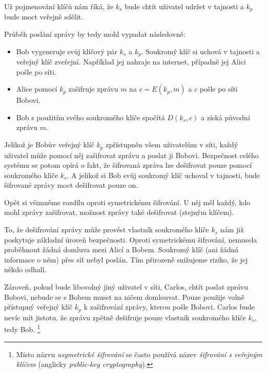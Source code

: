 \documentclass[
  program=infoi,
  biblatex,
  figures=false,
  glossaries,
  index
]{kidiplom}
\begin{document}
    Už pojmenování klíčů nám říká, že $k_s$ bude chtít uživatel udržet v tajnosti a $k_p$ bude moct veřejně sdělit.

    \medskip

    Průběh poslání zprávy by tedy mohl vypadat následovně:

    \begin{itemize}
        \item
            Bob vygeneruje svůj klíčový pár $k_s$ a $k_p$.
            Soukromý klíč si uchová v tajnosti a veřejný klíč zveřejní. Například jej nahraje na internet, případně jej Alici pošle po síti.
        \item
            Alice pomocí $k_p$ zašifruje zprávu $m$ na $c=E(k_p, m)$ a $c$ pošle po síti Bobovi.
        \item 
            Bob s použitím svého soukromého klíče spočítá $D(k_s, c)$ a získá původní zprávu $m$.
    \end{itemize}

    Jelikož je Bobův veřejný klíč $k_p$ zpřístupněn všem uživatelům v síti, každý uživatel může pomocí něj zašifrovat zprávu a poslat ji Bobovi.
    Bezpečnost celého systému se potom opírá o fakt, že šifrovaná zpráva lze dešifrovat pouze pomocí soukromého klíče $k_s$.
    A jelikož si Bob svůj soukromý klíč uchoval v tajnosti, bude šifrované zprávy moct dešifrovat pouze on.

    \begin{remark}
        Opět si všimněme rozdílu oproti symetrickému šifrování.
        U něj měl každý, kdo mohl zprávy zašifrovat, možnost zprávy také dešifrovat (stejným klíčem).
    \end{remark}

    To, že dešifrování zprávy může provést vlastník soukromého klíče $k_s$ nám již poskytuje základní úroveň bezpečnosti.
    Oproti symetrickému šifrování, nemusela proběhnout žádná domluva mezi Alicí a Bobem.
    Soukromý klíč (ani žádná informace o něm) přes síť nebyl poslán. Tím přirozeně snižujeme riziko, že jej někdo odhalí.

    Zároveň, pokud bude libovolný jiný uživatel v síti, Carlos, chtít poslat zprávu Bobovi, nebude se s Bobem muset na ničem domlouvat.
    Pouze použije volně přístupný veřejný klíč $k_p$ k zašifrování zprávy, kterou pošle Bobovi.
    Carlos bude nevíc mít jistotu, že zprávu zpětně dešifruje pouze vlastník soukromého klíče $k_s$, tedy Bob.
    \footnote{Místo názvu \emph{asymetrické šifrování} se často používá
    název \emph{šifrování s veřejným klíčem} (anglicky \emph{public-key cryptography}).}
\end{document}
